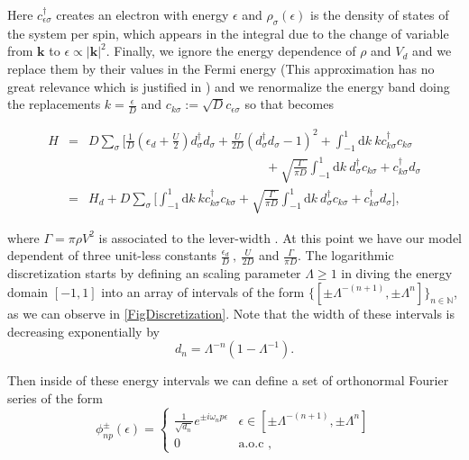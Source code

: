 Here $c_{\epsilon\sigma}^{\dagger}$ creates an electron with energy
$\epsilon$ and $\rho_{\sigma}(\epsilon)$ is the density of states
of the system per spin, which appears in the integral due to the change
of variable from $\mathbf{k}$ to $\epsilon\propto\left|\mathbf{k}\right|^{2}.$
Finally, we ignore the energy dependence of $\rho$ and $V_{d}$ and
we replace them by their values in the Fermi energy (This approximation
has no great relevance which is justified in \citep{krishna-murthy_renormalization-group_1980})
and we renormalize the energy band doing the replacements $k=\frac{\epsilon}{D}$
and $c_{k\sigma}:=\sqrt{D}c_{\epsilon\sigma}$ so that 
becomes

\begin{eqnarray}
H & = & D\sum_{\sigma}\Biggl[\frac{1}{D}\left(\epsilon_{d}+\frac{U}{2}\right)d_{\sigma}^{\dagger}d_{\sigma}+\frac{U}{2D}(d_{\sigma}^{\dagger}d_{\sigma}-1)^{2}+\int_{-1}^{1}\mbox{d}k\ kc_{k\sigma}^{\dagger}c_{k\sigma}\nonumber \\
 &  & \qquad\qquad\qquad\qquad\qquad\qquad\qquad+\sqrt{\frac{\Gamma}{\pi D}}\int_{-1}^{1}\mbox{d}k\ d_{\sigma}^{\dagger}c_{k\sigma}+c_{k\sigma}^{\dagger}d_{\sigma}\label{eq:Norm-HamEnergy}\\
 & = & H_{d}+D\sum_{\sigma}\Biggl[\int_{-1}^{1}\mbox{d}k\ kc_{k\sigma}^{\dagger}c_{k\sigma}+\sqrt{\frac{\Gamma}{\pi D}}\int_{-1}^{1}\mbox{d}k\ d_{\sigma}^{\dagger}c_{k\sigma}+c_{k\sigma}^{\dagger}d_{\sigma}\Biggr],
\end{eqnarray}


where $\Gamma=\pi\rho V^{2}$ is associated to the lever-width \citep[(3.5)]{sindel_numerical_2005}.
At this point we have our model dependent of three unit-less constants
$\frac{\epsilon_{d}}{D}\ ,\ \frac{U}{2D}$ and $\frac{\Gamma}{\pi D}$.
The logarithmic discretization starts by defining an scaling parameter
$\Lambda\geq1$ in diving the energy domain $[-1,1]$ into an array
of intervals of the form $\{[\pm\Lambda^{-(n+1)},\pm\Lambda^{n}]\}_{n\in\mathbb{N}}$,
as we can observe in \ref{FigDiscretization}. Note that the width
of these intervals is decreasing exponentially by 
\[
d_{n}=\Lambda^{-n}\left(1-\Lambda^{-1}\right).
\]


Then inside of these energy intervals we can define a set of orthonormal
Fourier series of the form
\begin{equation}
\phi_{np}^{\pm}(\epsilon)=\begin{cases}
\frac{1}{\sqrt{d_{n}}}e^{\pm i\omega_{n}p\epsilon} & \epsilon\in[\pm\Lambda^{-(n+1)},\pm\Lambda^{n}]\\
0 & \mbox{a.o.c },
\end{cases}\label{eq:orthonormal-Fourier}
\end{equation}


